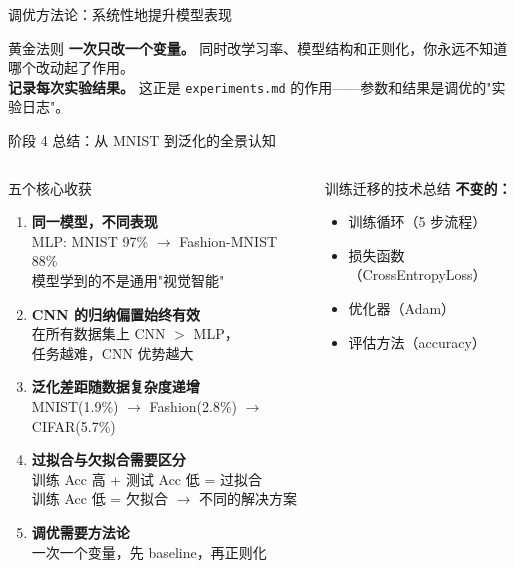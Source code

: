 \documentclass[aspectratio=169]{ctexbeamer}
\begin{document}
\begin{frame}[shrink=20]{调优方法论：系统性地提升模型表现}
\vspace{0.1cm}

\begin{exampleblock}{黄金法则}
\footnotesize
\textbf{一次只改一个变量。} 同时改学习率、模型结构和正则化，你永远不知道哪个改动起了作用。\\
\textbf{记录每次实验结果。} 这正是 \texttt{experiments.md} 的作用——参数和结果是调优的"实验日志"。
\end{exampleblock}
\end{frame}

\begin{frame}[shrink=22]{阶段 4 总结：从 MNIST 到泛化的全景认知}
\small

\begin{columns}[T]
\begin{block}{五个核心收获}
\footnotesize
\begin{enumerate}
  \item \textbf{同一模型，不同表现}\\
  MLP: MNIST 97\% $\to$ Fashion-MNIST 88\%\\
  模型学到的不是通用"视觉智能"

  \item \textbf{CNN 的归纳偏置始终有效}\\
  在所有数据集上 CNN $>$ MLP，\\
  任务越难，CNN 优势越大

  \item \textbf{泛化差距随数据复杂度递增}\\
  MNIST(1.9\%) $\to$ Fashion(2.8\%) $\to$ CIFAR(5.7\%)

  \item \textbf{过拟合与欠拟合需要区分}\\
  训练 Acc 高 + 测试 Acc 低 = 过拟合\\
  训练 Acc 低 = 欠拟合 $\to$ 不同的解决方案

  \item \textbf{调优需要方法论}\\
  一次一个变量，先 baseline，再正则化
\end{enumerate}
\end{block}

\begin{block}{训练迁移的技术总结}
\footnotesize
\textbf{不变的：}
\begin{itemize}
  \item 训练循环（5 步流程）
  \item 损失函数（CrossEntropyLoss）
  \item 优化器（Adam）
  \item 评估方法（accuracy）
\end{itemize}


\end{block}
\end{columns}
\end{frame}
\end{document}
